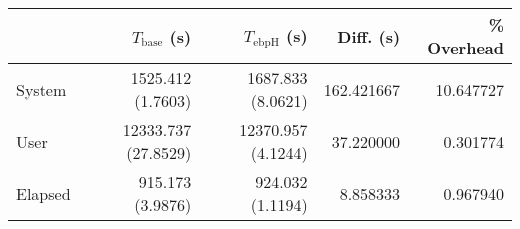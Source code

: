 \begin{tabular}{>{\ttfamily}lrrrr}
\toprule
\multicolumn{1}{l}{Category} &  $T_\text{base}$ (s) & $T_\text{ebpH}$ (s) &   Diff. (s) &  \% Overhead \\
\midrule
                      System &    1525.412 (1.7603) &   1687.833 (8.0621) &  162.421667 &    10.647727 \\
                        User &  12333.737 (27.8529) &  12370.957 (4.1244) &   37.220000 &     0.301774 \\
                     Elapsed &     915.173 (3.9876) &    924.032 (1.1194) &    8.858333 &     0.967940 \\
\bottomrule
\end{tabular}
